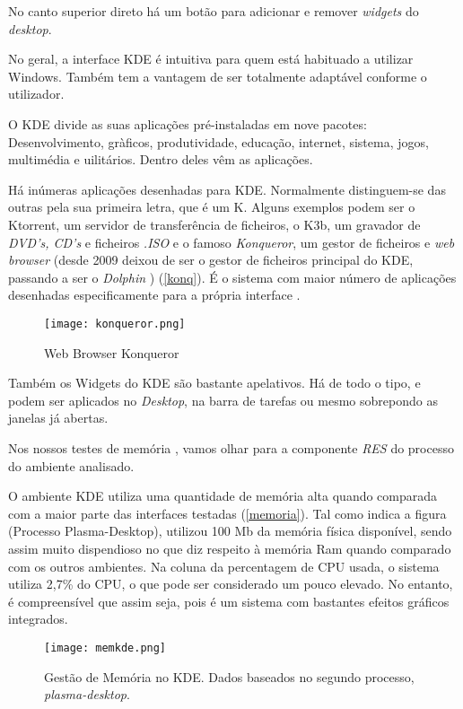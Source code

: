 \documentclass[11pt,openright,twoside]{report}
\begin{document}
No canto superior direto há um botão para adicionar e remover \textit{widgets} do \textit{desktop}.

No geral, a interface KDE é intuitiva para quem está habituado a utilizar Windows. Também tem a vantagem de ser totalmente adaptável conforme o utilizador.

O KDE divide as suas aplicações pré-instaladas em nove pacotes: Desenvolvimento, gràficos, produtividade, educação, internet, sistema, jogos, multimédia e uilitários. Dentro deles vêm as aplicações\cite{AplicacoesKDE}.

Há inúmeras aplicações desenhadas para KDE. Normalmente distinguem-se das outras pela sua primeira letra, que é um K. Alguns exemplos podem ser o Ktorrent, um servidor de transferência de ficheiros, o K3b, um gravador de \textit{DVD's, CD's} e ficheiros \textit{.ISO} e o famoso\textit{ Konqueror}, um gestor de ficheiros e \textit{web browser} (desde 2009 deixou de ser o gestor de ficheiros principal do KDE, passando a ser o \textit{Dolphin} \cite{dolphin}) (\autoref{konq}). É o sistema com maior número de aplicações desenhadas especificamente para a própria interface \cite{AppsKDE}.

\begin{figure}
 \center
 \texttt{[image: konqueror.png]}
 \caption{Web Browser Konqueror}
  \label{konq}
\end{figure}

Também os Widgets do KDE são bastante apelativos. Há de todo o tipo, e podem ser aplicados no \textit{Desktop}, na barra de tarefas ou mesmo sobrepondo as janelas já abertas.

Nos nossos testes de memória \cite{Memoriavirt}, vamos olhar para a componente \textit{RES} do processo do ambiente analisado.

O ambiente KDE utiliza uma quantidade de memória alta quando comparada com a maior parte das interfaces testadas (\autoref{memoria}). Tal como indica a figura (Processo Plasma-Desktop), utilizou 100 Mb da memória física disponível, sendo assim muito dispendioso no que diz respeito à memória Ram quando comparado com os outros ambientes. Na coluna da percentagem de CPU usada, o sistema utiliza 2,7\% do CPU, o que pode ser considerado um pouco elevado. No entanto, é compreensível que assim seja, pois é um sistema com bastantes efeitos gráficos integrados.

\begin{figure}
 \center
 \texttt{[image: memkde.png]}
 \caption{Gestão de Memória no KDE. Dados baseados no segundo processo, \textit{plasma-desktop}.}
  \label{memoria}
\end{figure}
\end{document}

